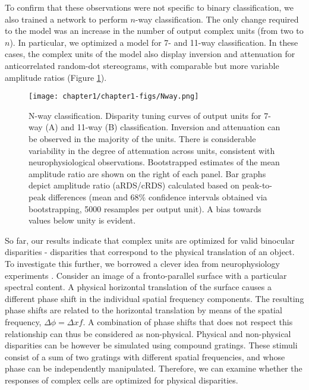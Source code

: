 To confirm that these observations were not specific to binary classification, we also trained a network to perform $n$-way classification. The only change required to the model was an increase in the number of output complex units (from two to $n$). In particular, we optimized a model for 7- and 11-way classification. In these cases, the complex units of the model also display inversion and attenuation for anticorrelated random-dot stereograms, with comparable but more variable amplitude ratios (Figure \ref{fig:Nway}).

\begin{figure}
  \centering
  \texttt{[image: chapter1/chapter1-figs/Nway.png]}
  \caption[N-way classification.]{N-way classification. Disparity tuning curves of output units for 7-way (A) and 11-way (B) classification. Inversion and attenuation can be observed in the majority of the units. There is considerable variability in the degree of attenuation across units, consistent with neurophysiological observations. Bootstrapped estimates of the mean amplitude ratio are shown on the right of each panel. Bar graphs depict amplitude ratio (aRDS/cRDS) calculated based on peak-to-peak differences (mean and $68\%$ confidence intervals obtained via bootstrapping, 5000 resamples per output unit). A bias towards values below unity is evident.}
  \label{fig:Nway}
\end{figure}

So far, our results indicate that complex units are optimized for valid binocular disparities - disparities that correspond to the physical translation of an object. To investigate this further, we borrowed a clever idea from neurophysiology experiments \cite{Haefner:2008jg}. Consider an image of a fronto-parallel surface with a particular spectral content. A physical horizontal translation of the surface causes a different phase shift in the individual spatial frequency components. The resulting phase shifts are related to the horizontal translation by means of the spatial frequency, $\Delta \phi= \Delta x f$. A combination of phase shifts that does not respect this relationship can thus be considered as non-physical. Physical and non-physical disparities can be however be simulated using compound gratings. These stimuli consist of a sum of two gratings with different spatial frequencies, and whose phase can be independently manipulated. Therefore, we can examine whether the responses of complex cells are optimized for physical disparities.

